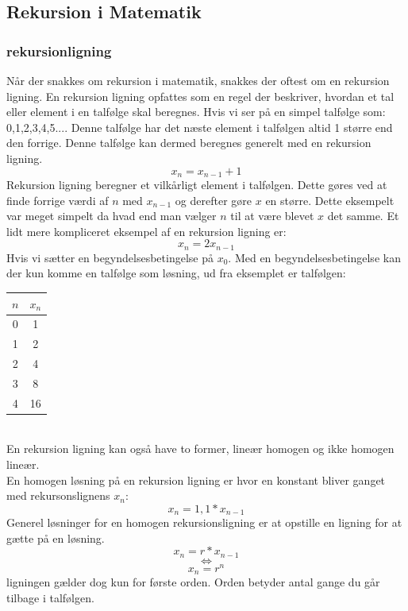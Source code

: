\documentclass[12pt]{article}
\begin{document}
\subsection{Rekursion i Matematik}
\subsubsection{rekursionligning}
Når der snakkes om rekursion i matematik, snakkes der oftest om en rekursion ligning. 
En rekursion ligning opfattes som en regel der beskriver, hvordan et tal eller element i en talfølge skal beregnes. Hvis vi ser på en simpel talfølge som: {0,1,2,3,4,5...}. Denne talfølge har det næste element i talfølgen altid 1 større end den forrige. Denne talfølge kan dermed beregnes generelt med en rekursion ligning. 
\[x_n = x_{n-1} + 1\] 
Rekursion ligning beregner et vilkårligt element i talfølgen. Dette gøres ved at finde forrige værdi af $n$ med $x_{n-1}$ og derefter gøre $x$ en større. 
Dette eksempelt var meget simpelt da hvad end man vælger $n$ til at være blevet $x$ det samme. 
Et lidt mere kompliceret eksempel af en rekursion ligning er:
\[x_n = 2x_{n-1}\] 
Hvis vi sætter en begyndelsesbetingelse på $x_{0}$.
Med en begyndelsesbetingelse kan der kun komme en talfølge som løsning, 
ud fra eksemplet er talfølgen:
\begin{table}[ht]
  \centering
  \begin{tabular}{ |c|c| }
   \hline
   \textbf{$n$} & \textbf{$x_{n}$}  \\ 
   \hline
   0 & 1  \\
   \hline
   1 & 2 \\ 
   \hline
   2 & 4 \\ 
   \hline
   3 & 8  \\ 
   \hline
   4 & 16  \\ 
   \hline
  \end{tabular}
\end{table}\\
En rekursion ligning kan også have to former, lineær homogen og ikke homogen lineær.\\  
En homogen løsning på en rekursion ligning er hvor en konstant bliver ganget med rekursonslignens $x_{n}$:
\[x_{n}=1,1*x_{n-1}\]
Generel løsninger for en homogen rekursionsligning er at opstille en ligning for at gætte på en løsning.\\ 
\[x_{n}=r*x_{n-1}\]
\[\Longleftrightarrow \]
\[x_{n}=r^n\]
ligningen gælder dog kun for første orden. Orden betyder antal gange du går tilbage i talfølgen.
\end{document}
